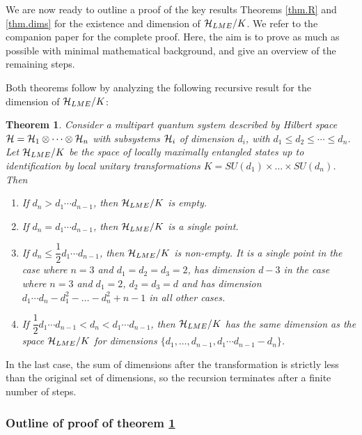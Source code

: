 \documentclass[12pt]{article}
\newtheorem{theorem}{Theorem}[section]
\theoremstyle{definition}
\begin{document}
We are now ready to outline a proof of the key results Theorems \ref{thm.R} and \ref{thm.dims} for the existence and dimension of ${\cal H}_{LME}/K$. We refer to the companion paper \cite{mathpaper} for the complete proof. Here, the aim is to prove as much as possible with minimal mathematical background, and give an overview of the remaining steps.

Both theorems follow by analyzing the following recursive result for the dimension of ${\cal H}_{LME}/K$:

\begin{theorem}\label{thm.States}
Consider a multipart quantum system described by Hilbert space ${\cal H} = {\cal H}_1  \otimes \cdots  \otimes {\cal H}_n$ with subsystems ${\cal H}_i$ of dimension $d_i$, with  $d_1 \leqslant d_2 \leqslant \cdots \leqslant d_n$. Let ${\cal H}_{LME}/K$ be the space of locally maximally entangled states up to identification by local unitary transformations $K = SU(d_1) \times \dots \times SU(d_n)$. Then
\begin{enumerate}

\item
If $d_n > d_1 \cdots d_{n-1}$, then ${\cal H}_{LME}/K$ is empty.

\item
If $d_n = d_1 \cdots d_{n-1}$, then ${\cal H}_{LME}/K$ is a single point.

\item
If $d_n \le \dfrac{1}{2} d_1 \cdots d_{n-1}$, 
then ${\cal H}_{LME}/K$ is non-empty.
It is a single point in the case where $n = 3$ and $d_1 = d_2 = d_3 = 2$,
has dimension $d - 3$ in the case where $n = 3$ and $d_1 = 2$, $d_2 = d_3 = d$
and has dimension $d_1 \cdots d_n -
d_1^2 - \dots - d_n^2 + n - 1$ in all other cases.

\item
If $\dfrac{1}{2} d_1 \cdots d_{n-1} < d_n < d_1 \cdots d_{n-1}$,
then ${\cal H}_{LME}/K$ has the same dimension as the space ${\cal H}_{LME}/K$ for dimensions $\{d_1,\dots,d_{n-1}, d_1 \cdots d_{n-1} - d_n\}$.
\end{enumerate}
\end{theorem}
In the last case, the sum of dimensions after the transformation is strictly less than the original set of dimensions, so the recursion terminates after a finite number of steps.

\subsubsection*{Outline of proof of theorem \ref{thm.States}}
\end{document}
